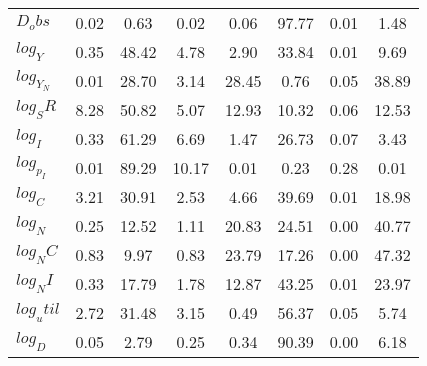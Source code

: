 \begin{center}
\begin{longtable}{lccccccc}
$D_obs     $	 & 	        0.02	 & 	        0.63	 & 	        0.02	 & 	        0.06	 & 	       97.77	 & 	        0.01	 & 	        1.48 \\ 
$log_Y     $	 & 	        0.35	 & 	       48.42	 & 	        4.78	 & 	        2.90	 & 	       33.84	 & 	        0.01	 & 	        9.69 \\ 
$log_Y_N   $	 & 	        0.01	 & 	       28.70	 & 	        3.14	 & 	       28.45	 & 	        0.76	 & 	        0.05	 & 	       38.89 \\ 
$log_SR    $	 & 	        8.28	 & 	       50.82	 & 	        5.07	 & 	       12.93	 & 	       10.32	 & 	        0.06	 & 	       12.53 \\ 
$log_I     $	 & 	        0.33	 & 	       61.29	 & 	        6.69	 & 	        1.47	 & 	       26.73	 & 	        0.07	 & 	        3.43 \\ 
$log_p_I   $	 & 	        0.01	 & 	       89.29	 & 	       10.17	 & 	        0.01	 & 	        0.23	 & 	        0.28	 & 	        0.01 \\ 
$log_C     $	 & 	        3.21	 & 	       30.91	 & 	        2.53	 & 	        4.66	 & 	       39.69	 & 	        0.01	 & 	       18.98 \\ 
$log_N     $	 & 	        0.25	 & 	       12.52	 & 	        1.11	 & 	       20.83	 & 	       24.51	 & 	        0.00	 & 	       40.77 \\ 
$log_NC    $	 & 	        0.83	 & 	        9.97	 & 	        0.83	 & 	       23.79	 & 	       17.26	 & 	        0.00	 & 	       47.32 \\ 
$log_NI    $	 & 	        0.33	 & 	       17.79	 & 	        1.78	 & 	       12.87	 & 	       43.25	 & 	        0.01	 & 	       23.97 \\ 
$log_util  $	 & 	        2.72	 & 	       31.48	 & 	        3.15	 & 	        0.49	 & 	       56.37	 & 	        0.05	 & 	        5.74 \\ 
$log_D     $	 & 	        0.05	 & 	        2.79	 & 	        0.25	 & 	        0.34	 & 	       90.39	 & 	        0.00	 & 	        6.18 \\ 
\end{longtable}
 \end{center}
